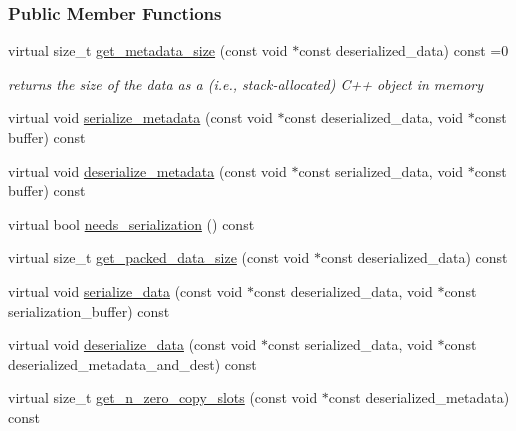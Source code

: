 \subsubsection*{Public Member Functions}
\begin{DoxyCompactItemize}
\item 
virtual size\+\_\+t \hyperlink{classdarma__runtime_1_1abstract_1_1frontend_1_1_serialization_manager_aea3d2e5de9badbe1dba23ac23c2f6a1b}{get\+\_\+metadata\+\_\+size} (const void $\ast$const deserialized\+\_\+data) const  =0
\begin{DoxyCompactList}\small\item\em returns the size of the data as a (i.\+e., stack-\/allocated) C++ object in memory \end{DoxyCompactList}\item 
virtual void \hyperlink{classdarma__runtime_1_1abstract_1_1frontend_1_1_serialization_manager_a257178cab2f041335026b6876f86e730}{serialize\+\_\+metadata} (const void $\ast$const deserialized\+\_\+data, void $\ast$const buffer) const 
\item 
virtual void \hyperlink{classdarma__runtime_1_1abstract_1_1frontend_1_1_serialization_manager_a8d703c61379cd5280ed7861c1600af76}{deserialize\+\_\+metadata} (const void $\ast$const serialized\+\_\+data, void $\ast$const buffer) const 
\item 
virtual bool \hyperlink{classdarma__runtime_1_1abstract_1_1frontend_1_1_serialization_manager_a674620c4245e7f916b98595840ed8e91}{needs\+\_\+serialization} () const 
\item 
virtual size\+\_\+t \hyperlink{classdarma__runtime_1_1abstract_1_1frontend_1_1_serialization_manager_a9213865a3780222b3b5839e25bd3271b}{get\+\_\+packed\+\_\+data\+\_\+size} (const void $\ast$const deserialized\+\_\+data) const 
\item 
virtual void \hyperlink{classdarma__runtime_1_1abstract_1_1frontend_1_1_serialization_manager_ae87cf73c64377e74728ea1bce1edd103}{serialize\+\_\+data} (const void $\ast$const deserialized\+\_\+data, void $\ast$const serialization\+\_\+buffer) const 
\item 
virtual void \hyperlink{classdarma__runtime_1_1abstract_1_1frontend_1_1_serialization_manager_a20ea2945275c2bf6ede9c0a1176b5b1e}{deserialize\+\_\+data} (const void $\ast$const serialized\+\_\+data, void $\ast$const deserialized\+\_\+metadata\+\_\+and\+\_\+dest) const 
\item 
virtual size\+\_\+t \hyperlink{classdarma__runtime_1_1abstract_1_1frontend_1_1_serialization_manager_a888d9ad9d2d1be97d114f57f730dad1a}{get\+\_\+n\+\_\+zero\+\_\+copy\+\_\+slots} (const void $\ast$const deserialized\+\_\+metadata) const 

\end{DoxyCompactItemize}
